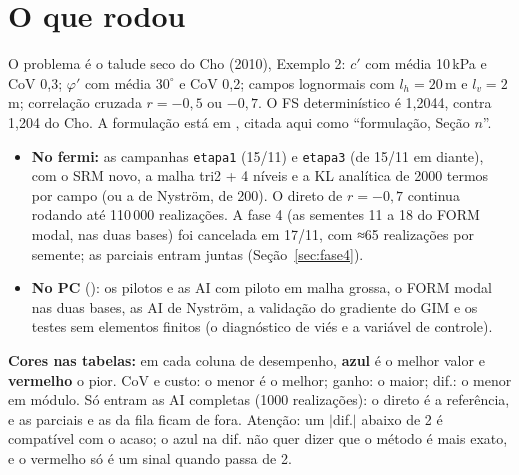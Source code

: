 \documentclass[11pt,a4paper]{article}
\begin{document}
\section{O que rodou}\label{sec:rodou}
O problema é o talude seco do Cho (2010), Exemplo 2: $c'$ com média 10\,kPa e CoV 0,3; $\varphi'$ com média $30^\circ$ e
CoV 0,2; campos lognormais com $l_h = 20$\,m e $l_v = 2$\,m; correlação cruzada $r = -0{,}5$ ou $-0{,}7$. O FS
determinístico é 1,2044, contra 1,204 do Cho. A formulação está em
, citada aqui como ``formulação, Seção $n$''.
\begin{itemize}
  \item \textbf{No fermi:} as campanhas \texttt{etapa1} (15/11) e \texttt{etapa3} (de 15/11 em diante), com o SRM novo,
    a malha tri2 + 4 níveis e a KL analítica de 2000 termos por campo (ou a de Nyström, de 200). O direto de
    $r = -0{,}7$ continua rodando até 110\,000 realizações. A fase 4 (as sementes 11 a 18 do FORM modal, nas duas
    bases) foi cancelada em 17/11, com ≈65 realizações por semente; as parciais entram juntas
    (Seção~\ref{sec:fase4}).
  \item \textbf{No PC} (): os pilotos e as AI com piloto em malha grossa, o FORM modal nas
    duas bases, as AI de Nyström, a validação do gradiente do GIM e os testes sem elementos finitos (o diagnóstico de viés
    e a variável de controle).
\end{itemize}
\textbf{Cores nas tabelas:} em cada coluna de desempenho, \textcolor{azul}{\textbf{azul}} é o melhor valor e
\textcolor{verm}{\textbf{vermelho}} o pior. CoV e custo: o menor é o melhor; ganho: o maior; dif.: o menor em módulo. Só
entram as AI completas (1000 realizações): o direto é a referência, e as parciais e as da fila ficam de fora. Atenção: um $|$dif.$|$ abaixo de 2 é compatível com o
acaso; o azul na dif. não quer dizer que o método é mais exato, e o vermelho só é um sinal quando passa de 2.
\end{document}
